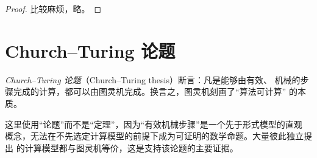\begin{proof}
  比较麻烦，略。
\end{proof}

\lecture
\label{lec:computability}

\section{Church--Turing 论题}

\emph{Church--Turing 论题}（Church--Turing thesis）断言：凡是能够由有效、
机械的步骤完成的计算，都可以由图灵机完成。换言之，图灵机刻画了“算法可计算”
的本质。

这里使用“论题”而不是“定理”，因为“有效机械步骤”是一个先于形式模型的直观
概念，无法在不先选定计算模型的前提下成为可证明的数学命题。大量彼此独立提出
的计算模型都与图灵机等价，这是支持该论题的主要证据。
